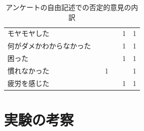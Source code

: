 \begin{table}[htbp]
\begin{tabular}{lrrrrr}
モヤモヤした       &                             &                            &                             & 1                          & 1                                       \\
何がダメかわからなかった &                             &                            &                             & 1                          & 1                                       \\
困った          &                             &                            &                             & 1                          & 1                                       \\
慣れなかった       &                             & 1                          &                             &                            & 1                                       \\
疲労を感じた       &                             &                            &                             & 1                          & 1                                      \\ \hline
\end{tabular}
\caption{アンケートの自由記述での否定的意見の内訳}
\label{table:nega}
\end{table}


\section{実験の考察}

